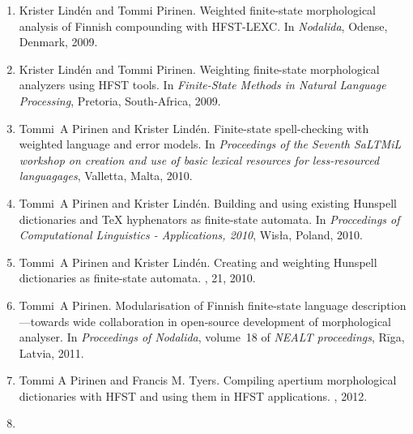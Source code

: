 \documentclass[officiallayout,final]{unihelcompling}
\begin{document}
\begin{enumerate}
    \item[\citetalias{pirinen2009weighted}]
        Krister Lindén and Tommi Pirinen.
        \newblock Weighted finite-state morphological analysis of Finnish 
        compounding with HFST-LEXC.
        \newblock In \emph{Nodalida}, Odense, Denmark, 2009.
    \item[\citetalias{pirinen2009weighting}]
        Krister Lindén and Tommi Pirinen.
        \newblock Weighting finite-state morphological analyzers using HFST
        tools.
        \newblock In \emph{Finite-State Methods in Natural Language Processing},
        Pretoria, South-Africa, 2009.
    \item[\citetalias{pirinen2010finitestate}]
        Tommi~A Pirinen and Krister Lindén.
        \newblock Finite-state spell-checking with weighted language and error
        models.
        \newblock In {\em Proceedings of the Seventh SaLTMiL workshop on 
            creation and use of basic lexical resources for less-resourced 
        languagages}, Valletta, Malta, 2010.
    \item[\citetalias{pirinen2010building}]
        Tommi~A Pirinen and Krister Lindén.
        \newblock Building and using existing Hunspell dictionaries and {\TeX }
        hyphenators as finite-state automata.
        \newblock In {\em Proccedings of Computational Linguistics -
            Applications, 2010}, Wis{\l}a, Poland, 2010.
    \item[\citetalias{pirinen2010creating}]
        Tommi~A Pirinen and Krister Lindén.
        \newblock Creating and weighting Hunspell dictionaries as finite-state
        automata.
        , 21, 2010.
    \item[\citetalias{pirinen2011modularisation}]
        Tommi~A Pirinen.
        \newblock Modularisation of Finnish finite-state language 
        description—towards wide collaboration in open-source development of
        morphological analyser.
        \newblock In {\em Proceedings of Nodalida}, volume~18 of {\em NEALT
        proceedings}, Rīga, Latvia, 2011.
    \item[\citetalias{pirinen2012compiling}]
        Tommi A Pirinen and Francis M. Tyers.
        \newblock Compiling apertium morphological dictionaries with HFST and
        using them in HFST applications.
        , 2012.
    \item[\citetalias{pirinen2012improving}]

\end{enumerate}
\end{document}
